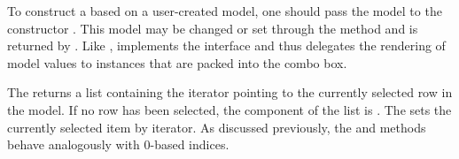 To construct a  based on a user-created model, one
should pass the model to the constructor
. This model may be changed or set through
the  method and is returned by
. Like ,
 implements the  interface and
thus delegates the rendering of model values to
 instances that are packed into the combo box.

The  returns a list containing the iterator
pointing to the currently selected row in the model.  If no row has been
selected, the  component of the list is .
The  sets the currently selected
item by iterator. As discussed previously, the
 and 
methods behave analogously with $0$-based indices.


